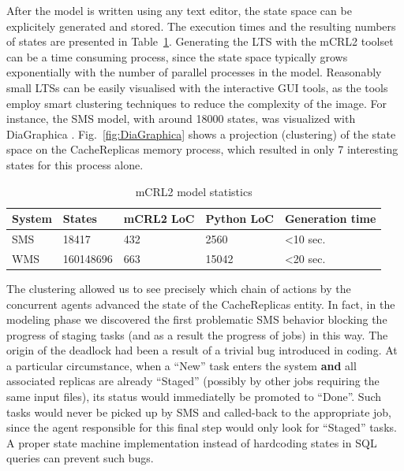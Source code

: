 \documentclass[10pt,conference]{IEEEtran}
\begin{document}
After the model is written using any text editor, the state space can be 
explicitely generated and stored. 
The execution times and the resulting numbers of states are
presented in Table~\ref{mcrl2Stats}.
Generating the LTS with the mCRL2 toolset can be a time consuming process,
since the state space typically grows exponentially with the number of parallel processes in the model.
Reasonably small LTSs can be easily visualised with the interactive GUI tools,
as the tools employ smart clustering techniques to reduce the complexity of the image.
For instance, the SMS model, with around 18000 states,
was visualized with DiaGraphica \cite{DiaGraphica}. Fig.~\ref{fig:DiaGraphica} shows a projection (clustering) of the state space
on the CacheReplicas memory process, which resulted in only 7 interesting states for this process alone.
\begin{table}[tp]
\caption{mCRL2 model statistics}
\label{mcrl2Stats}
  \centering
  \begin{tabular}[0.7\textwidth]{ | p{0.8cm} || l | p{0.8cm} | p{0.7cm} | p{1.2cm} | }
    \hline
  \rowcolor[gray]{0.9}
   System & States & mCRL2 LoC & Python LoC & Generation time \\ \hline\hline
   SMS & 18417 & 432 & 2560 & \textless 10 sec. \\ \hline
   WMS\footnotemark[1] & 160148696 & 663 & 15042 & \textless 20 sec. \\
    \hline
  \end{tabular}
\end{table}
The clustering
allowed us to see precisely which chain of actions by the concurrent agents
advanced the state of the CacheReplicas entity. In fact, in the modeling phase we discovered the first problematic
SMS behavior blocking the progress of staging
tasks (and as a result the progress of jobs) in this way. The origin of the deadlock had been a
result of a trivial bug introduced in coding. At a particular circumstance,
when a ``New'' task enters the system \textbf{and} all associated replicas
are already ``Staged'' (possibly by other jobs requiring the same input files),
its status would immediatelly be promoted to ``Done''.
Such tasks would never be picked up by SMS and called-back to the appropriate job, 
since the agent responsible for this final step would only look for ``Staged'' tasks.
A proper state machine implementation
instead of hardcoding states in SQL queries can prevent such bugs.
\end{document}
